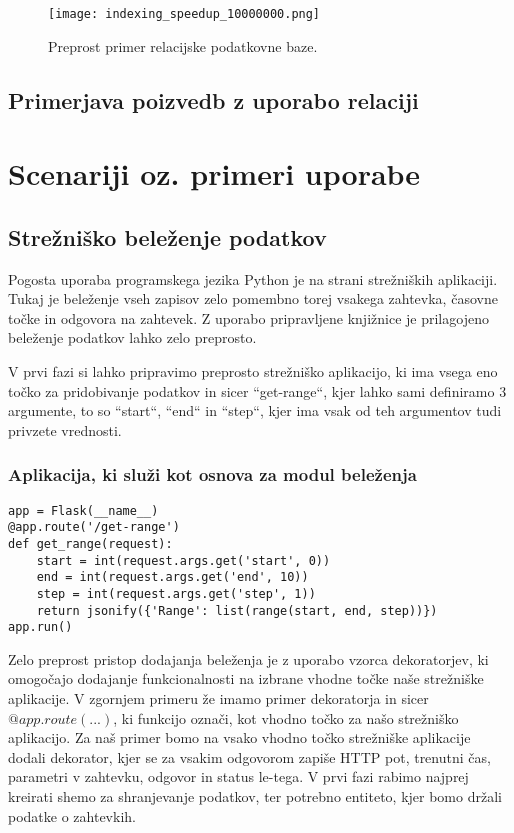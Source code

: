 \documentclass[a4paper,12pt,openright]{book}
\begin{document}
    \begin{figure}[H]
        \centerline{\texttt{[image: indexing\_speedup\_10000000.png]}}
        \caption{Preprost primer relacijske podatkovne baze.}
        \label{vnospodatkov_index}
    \end{figure}

    \newpage
    \section{Primerjava poizvedb z uporabo relaciji}


    
\chapter{Scenariji oz. primeri uporabe}
\label{ch3}
    \section{Strežniško beleženje podatkov}

    Pogosta uporaba programskega jezika Python je na strani strežniških aplikaciji. Tukaj je beleženje vseh zapisov zelo pomembno torej vsakega zahtevka, časovne točke in odgovora na zahtevek. Z uporabo pripravljene knjižnice je prilagojeno beleženje podatkov lahko zelo preprosto.

    V prvi fazi si lahko pripravimo preprosto strežniško aplikacijo, ki ima vsega eno točko za pridobivanje podatkov in sicer ``get-range``, kjer lahko sami definiramo 3 argumente, to so ``start``, ``end`` in ``step``, kjer ima vsak od teh argumentov tudi privzete vrednosti.

    \subsection{Aplikacija, ki služi kot osnova za modul beleženja}
\begin{verbatim}
app = Flask(__name__)
@app.route('/get-range')
def get_range(request):
    start = int(request.args.get('start', 0))
    end = int(request.args.get('end', 10))
    step = int(request.args.get('step', 1))
    return jsonify({'Range': list(range(start, end, step))})
app.run()
\end{verbatim}

    \noindent
    Zelo preprost pristop dodajanja beleženja je z uporabo vzorca dekoratorjev, ki omogočajo dodajanje funkcionalnosti na izbrane vhodne točke naše strežniške aplikacije. V zgornjem primeru že imamo primer dekoratorja in sicer $@app.route(...)$, ki funkcijo označi, kot vhodno točko za našo strežniško aplikacijo. Za naš primer bomo na vsako vhodno točko strežniške aplikacije dodali dekorator, kjer se za vsakim odgovorom zapiše HTTP pot, trenutni čas, parametri v zahtevku, odgovor in status le-tega. V prvi fazi rabimo najprej kreirati shemo za shranjevanje podatkov, ter potrebno entiteto, kjer bomo držali podatke o zahtevkih.
\end{document}
